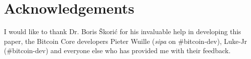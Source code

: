 \section*{Acknowledgements}
I would like to thank Dr. Boris \v{S}kori\'{c} for his invaluable help in developing this paper, the Bitcoin Core developers Pieter Wuille (\textit{sipa} on \#bitcoin-dev), Luke-Jr (\#bitcoin-dev) and everyone else who has provided me with their feedback.